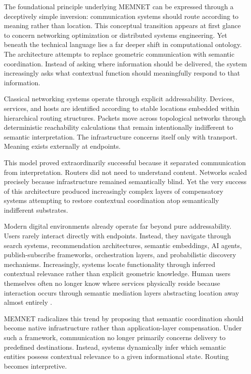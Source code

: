 \documentclass[11pt,a4paper]{article}
\begin{document}
The foundational principle underlying MEMNET can be expressed through a deceptively simple inversion: communication systems should route according to meaning rather than location. This conceptual transition appears at first glance to concern networking optimization or distributed systems engineering. Yet beneath the technical language lies a far deeper shift in computational ontology. The architecture attempts to replace geometric communication with semantic coordination. Instead of asking where information should be delivered, the system increasingly asks what contextual function should meaningfully respond to that information.

Classical networking systems operate through explicit addressability. Devices, services, and hosts are identified according to stable locations embedded within hierarchical routing structures. Packets move across topological networks through deterministic reachability calculations that remain intentionally indifferent to semantic interpretation. The infrastructure concerns itself only with transport. Meaning exists externally at endpoints.

This model proved extraordinarily successful because it separated communication from interpretation. Routers did not need to understand content. Networks scaled precisely because infrastructure remained semantically blind. Yet the very success of this architecture produced increasingly complex layers of compensatory systems attempting to restore contextual coordination atop semantically indifferent substrates.

Modern digital environments already operate far beyond pure addressability. Users rarely interact directly with endpoints. Instead, they navigate through search systems, recommendation architectures, semantic embeddings, AI agents, publish-subscribe frameworks, orchestration layers, and probabilistic discovery mechanisms. Increasingly, systems locate functionality through inferred contextual relevance rather than explicit geometric knowledge. Human users themselves often no longer know where services physically reside because interaction occurs through semantic mediation layers abstracting location away almost entirely \cite{nameddata}.

MEMNET radicalizes this trend by proposing that semantic coordination should become native infrastructure rather than application-layer compensation. Under such a framework, communication no longer primarily concerns delivery to predefined destinations. Instead, systems dynamically infer which semantic entities possess contextual relevance to a given informational state. Routing becomes interpretive.
\end{document}
